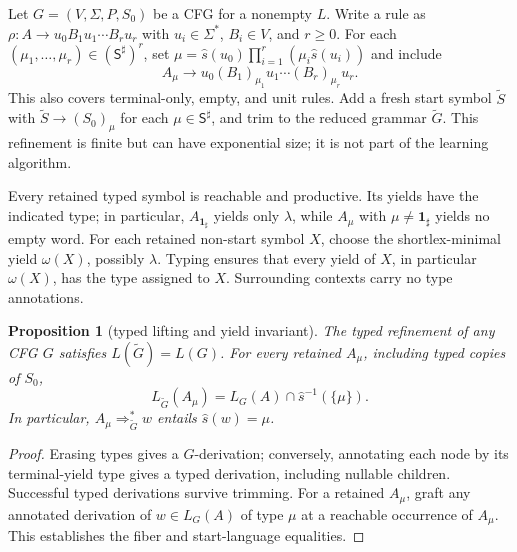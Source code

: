 \documentclass[11pt,a4paper]{article}
\newtheorem{proposition}[theorem]{Proposition}
\theoremstyle{remark}
\theoremstyle{plain}
\begin{document}
Let $G=(V,\Sigma,P,S_0)$ be a CFG for
a nonempty $L$.  Write a rule as
$\rho:A\to u_0B_1u_1\cdots B_ru_r$
with $u_i\in\Sigma^*$, $B_i\in V$, and $r\ge0$.
For each $(\mu_1,\ldots,\mu_r)\in(\mathsf S^\sharp)^r$,
set $\mu=\widehat s(u_0)\prod_{i=1}^r
(\mu_i\widehat s(u_i))$ and include
\[
 A_\mu\to u_0(B_1)_{\mu_1}u_1\cdots(B_r)_{\mu_r}u_r.
\]
This also covers terminal-only, empty, and unit rules.
Add a fresh start symbol $\widetilde S$ with
$\widetilde S\to(S_0)_\mu$ for each
$\mu\in\mathsf S^\sharp$, and trim to the reduced
grammar $\widetilde G$.  This refinement is finite
but can have exponential size; it is not part of
the learning algorithm.

Every retained typed symbol is reachable and productive.
Its yields have the indicated type; in particular,
$A_{\mathbf{1}_{\sharp}}$ yields only $\lambda$, while
$A_\mu$ with $\mu\ne\mathbf{1}_{\sharp}$ yields no empty word.
For each retained non-start symbol $X$, choose the
shortlex-minimal yield $\omega(X)$, possibly $\lambda$.
Typing ensures that every yield of $X$, in particular
$\omega(X)$, has the type assigned to $X$.
Surrounding contexts carry no type annotations.

\begin{proposition}[typed lifting and yield invariant]\label{prop:typed-core}
The typed refinement of any CFG $G$ satisfies
$L(\widetilde G)=L(G)$.  For every retained $A_\mu$,
including typed copies of $S_0$,
\[
L_{\widetilde G}(A_\mu)
 =L_G(A)\cap \widehat s^{-1}(\{\mu\}).
\]
In particular, $A_\mu\Rightarrow_{\widetilde G}^*w$
entails $\widehat s(w)=\mu$.
\end{proposition}
\begin{proof}
Erasing types gives a $G$-derivation; conversely,
annotating each node by its terminal-yield type
gives a typed derivation, including nullable children.
Successful typed derivations survive trimming.
For a retained $A_\mu$, graft any annotated
derivation of $w\in L_G(A)$ of type $\mu$
at a reachable occurrence of $A_\mu$.
This establishes the fiber and start-language equalities.
\end{proof}
\end{document}
